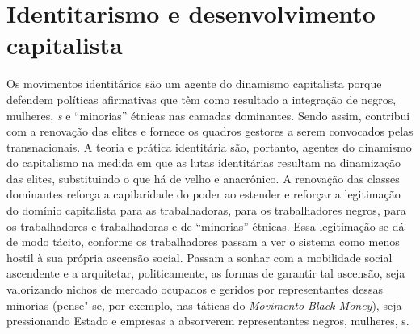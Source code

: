 \chapter{Identitarismo e desenvolvimento capitalista}

Os movimentos identitários são um agente do dinamismo capitalista porque
defendem políticas afirmativas que têm como resultado a integração de
negros, mulheres, \emph{s} e ``minorias'' étnicas nas camadas
dominantes. Sendo assim, contribui com a renovação das elites e fornece
os quadros gestores a serem convocados pelas transnacionais. A teoria e
prática identitária são, portanto, agentes do dinamismo do capitalismo
na medida em que as lutas identitárias resultam na dinamização das
elites, substituindo o que há de velho e anacrônico. A renovação das
classes dominantes reforça a capilaridade do poder ao estender e
reforçar a legitimação do domínio capitalista para as trabalhadoras,
para os trabalhadores negros, para os trabalhadores e trabalhadoras
 e de ``minorias'' étnicas. Essa legitimação se dá de modo tácito,
conforme os trabalhadores passam a ver o sistema como menos hostil à sua
própria ascensão social. Passam a sonhar com a mobilidade social
ascendente e a arquitetar, politicamente, as formas de garantir tal
ascensão, seja valorizando nichos de mercado ocupados e geridos por
representantes dessas minorias (pense"-se, por exemplo, nas táticas do
\emph{Movimento Black Money}), seja pressionando Estado e empresas a
absorverem representantes negros, mulheres, s.

